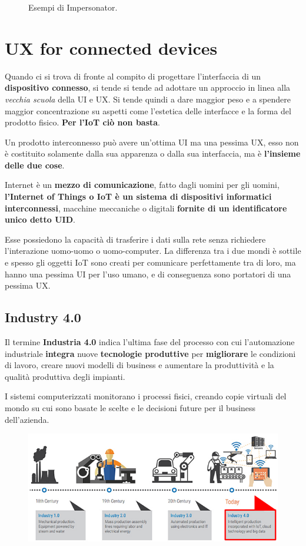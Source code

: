 \documentclass[a4paper,11pt,oneside]{book}
\begin{document}
\begin{figure}[!h]
	\caption{Esempi di Impersonator.}
\end{figure}

\pagebreak

\chapter{UX for connected devices}

Quando ci si trova di fronte al compito di progettare l'interfaccia di un \textbf{dispositivo
	connesso}, si tende si tende ad adottare un approccio in linea alla \textit{vecchia
	scuola} della UI e UX. Si tende quindi a dare maggior peso e a spendere maggior concentrazione su aspetti come l'estetica delle interfacce e la forma del prodotto fisico. \textbf{Per l'IoT ciò non basta}.

Un prodotto interconnesso può avere un'ottima UI ma una pessima UX, esso non è costituito solamente dalla sua apparenza o dalla sua interfaccia, ma è \textbf{l'insieme delle due cose}.

Internet è un \textbf{mezzo di comunicazione}, fatto dagli uomini per gli uomini, \textbf{l'Internet of Things o IoT è un sistema di dispositivi informatici interconnessi}, macchine meccaniche o digitali \textbf{fornite di un identificatore unico detto UID}.

Esse possiedono la capacità di trasferire i dati sulla rete senza richiedere l'interazione uomo-uomo o uomo-computer.
La differenza tra i due mondi è sottile e spesso gli oggetti IoT sono creati per comunicare perfettamente tra di loro, ma hanno una pessima UI per l'uso umano, e
di conseguenza sono portatori di una pessima UX.

\section{Industry 4.0}

Il termine \textbf{Industria 4.0} indica l'ultima fase del processo con cui l'automazione industriale \textbf{integra} nuove \textbf{tecnologie produttive} per \textbf{migliorare} le condizioni di lavoro, creare nuovi modelli di business e aumentare la produttività e la qualità produttiva degli impianti.

I sistemi computerizzati monitorano i processi fisici, creando copie virtuali del mondo su cui sono basate le scelte e le decisioni future per il business dell'azienda.

\begin{figure}[!h]
	\centering
	\includegraphics[scale=0.7]{immagini/Industry4.png}
\end{figure}
\end{document}
